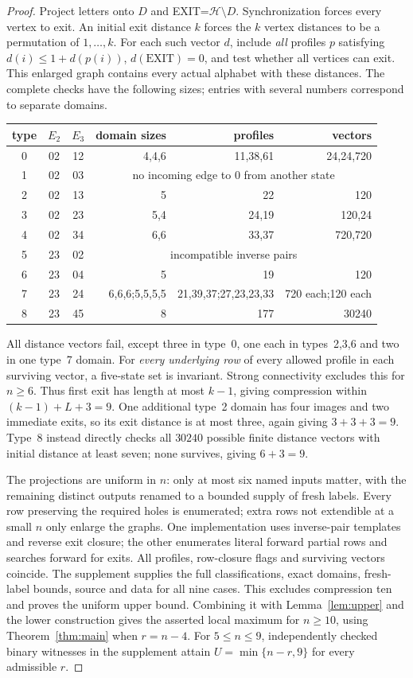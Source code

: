 \documentclass[10pt]{article}
\begin{document}
\begin{proof}
Project letters onto $D$ and EXIT=$\mathcal H\setminus D$.
Synchronization forces every vertex to exit. An initial exit distance
$k$ forces the $k$ vertex distances to be a permutation of $1,\ldots,k$.
For each such vector $d$, include \emph{all} profiles $p$ satisfying
$d(i)\le1+d(p(i))$, $d(\mathrm{EXIT})=0$, and test whether all vertices can
exit. This enlarged graph contains every actual alphabet with these
distances. The complete checks have the following sizes; entries with
several numbers correspond to separate domains.
\begin{center}\small
\begin{tabular}{cccrrr}
 type&$E_2$&$E_3$&domain sizes&profiles&vectors\\ \hline
 0&02&12&4,4,6&11,38,61&24,24,720\\
 1&02&03&\multicolumn{3}{c}{no incoming edge to 0 from another state}\\
 2&02&13&5&22&120\\
 3&02&23&5,4&24,19&120,24\\
 4&02&34&6,6&33,37&720,720\\
 5&23&02&\multicolumn{3}{c}{incompatible inverse pairs}\\
 6&23&04&5&19&120\\
 7&23&24&6,6,6;5,5,5,5&21,39,37;27,23,23,33&720 each;120 each\\
 8&23&45&8&177&30240
\end{tabular}
\end{center}
All distance vectors fail, except three in type~0, one each in
types~2,3,6 and two in one type~7 domain.
For \emph{every underlying row} of every allowed profile in each surviving
vector, a five-state set is invariant. Strong connectivity excludes
this for $n\ge6$. Thus first exit has length at most $k-1$, giving
compression within $(k-1)+L+3=9$.
One additional type~2 domain has four images and two immediate exits,
so its exit distance is at most three, again giving $3+3+3=9$.
Type~8 instead directly checks all $30240$ possible finite distance
vectors with initial distance at least seven; none survives, giving
$6+3=9$.

The projections are uniform in $n$: only at most six named inputs
matter, with the remaining distinct outputs renamed to a bounded supply
of fresh labels. Every row preserving the required holes is enumerated;
extra rows not extendible at a small $n$ only enlarge the graphs.
One implementation uses inverse-pair templates and reverse exit closure;
the other enumerates literal forward partial rows and searches forward
for exits. All profiles, row-closure flags and surviving vectors coincide.
The supplement supplies the full classifications, exact domains,
fresh-label bounds, source and data for all nine cases.
This excludes compression ten and proves the uniform upper bound.
Combining it with Lemma~\ref{lem:upper} and the lower construction gives
the asserted local maximum for $n\ge10$, using Theorem~\ref{thm:main}
when $r=n-4$. For $5\le n\le9$, independently checked binary witnesses
in the supplement attain $U=\min\{n-r,9\}$ for every admissible $r$.
\end{proof}
\end{document}
